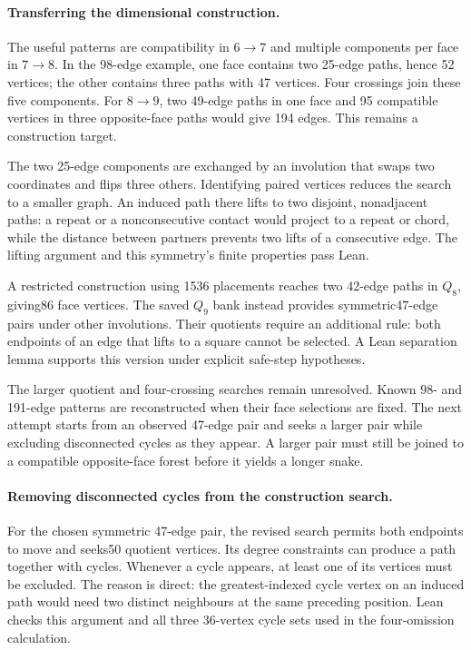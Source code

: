 \documentclass[11pt,a4paper]{article}
\begin{document}
\paragraph{Transferring the dimensional construction.}
The useful patterns are compatibility in $6\to 7$ and multiple
components per face in $7\to 8$. In the 98-edge example, one face
contains two 25-edge paths, hence 52 vertices; the other contains
three paths with 47 vertices. Four crossings join these five
components. For $8\to 9$, two 49-edge paths in one face and 95
compatible vertices in three opposite-face paths would give 194
edges. This remains a construction target.

The two 25-edge components are exchanged by an involution that swaps
two coordinates and flips three others. Identifying paired vertices
reduces the search to a smaller graph. An induced path there lifts
to two disjoint, nonadjacent paths: a repeat or a nonconsecutive
contact would project to a repeat or chord, while the distance
between partners prevents two lifts of a consecutive edge.
The lifting argument and this symmetry's finite properties pass Lean.

A restricted construction using 1536 placements reaches two 42-edge
paths in $Q_8$, giving86 face vertices. The saved $Q_9$ bank instead
provides symmetric47-edge pairs under other involutions. Their
quotients require an additional rule: both endpoints of an edge
that lifts to a square cannot be selected. A Lean separation lemma
supports this version under explicit safe-step hypotheses.

The larger quotient and four-crossing searches remain unresolved.
Known 98- and 191-edge patterns are reconstructed when their face
selections are fixed. The next attempt starts from an observed
47-edge pair and seeks a larger pair while excluding disconnected
cycles as they appear. A larger pair must still be joined to a
compatible opposite-face forest before it yields a longer snake.


\paragraph{Removing disconnected cycles from the construction search.}
For the chosen symmetric 47-edge pair, the revised search permits
both endpoints to move and seeks50 quotient vertices. Its degree
constraints can produce a path together with cycles. Whenever a
cycle appears, at least one of its vertices must be excluded.
The reason is direct: the greatest-indexed cycle vertex on an
induced path would need two distinct neighbours at the same
preceding position. Lean checks this argument and all three
36-vertex cycle sets used in the four-omission calculation.
\end{document}
